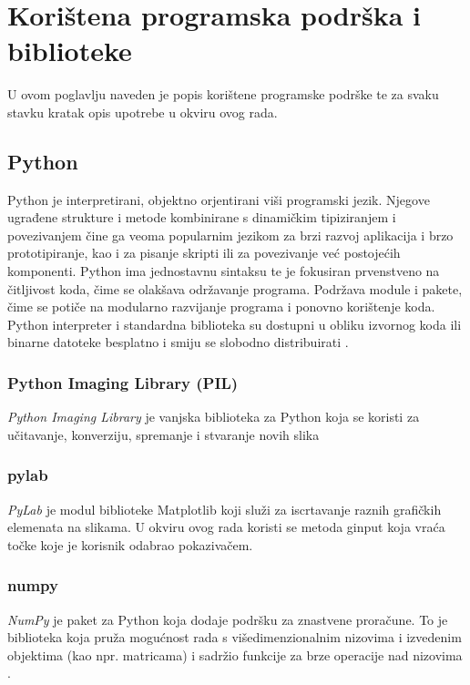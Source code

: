 \chapter{Korištena programska podrška i biblioteke}
\label{ch:podrska}

U ovom poglavlju naveden je popis korištene programske podrške te za svaku stavku kratak opis upotrebe u okviru ovog rada.

\section{Python}
\label{sec:podrskaPython}

Python je interpretirani, objektno orjentirani viši programski jezik. Njegove ugrađene strukture i metode kombinirane s dinamičkim tipiziranjem i povezivanjem čine ga veoma popularnim jezikom za brzi razvoj aplikacija  i brzo prototipiranje, kao i za pisanje skripti ili za povezivanje već postojećih komponenti. Python ima jednostavnu sintaksu te je fokusiran prvenstveno na čitljivost koda, čime se olakšava održavanje programa. Podržava module i pakete, čime se potiče na modularno razvijanje programa i ponovno korištenje koda. Python interpreter i standardna biblioteka su dostupni u obliku izvornog koda ili binarne datoteke besplatno i smiju se slobodno distribuirati \citep{Python}.

\subsection{Python Imaging Library (PIL)}
\label{subsec:pil}
\emph{Python Imaging Library} je vanjska biblioteka za Python koja se koristi za učitavanje, konverziju, spremanje i stvaranje novih slika \citep{PIL}

\subsection{pylab}
\label{subsec:pylab}

\emph{PyLab} je modul biblioteke Matplotlib koji služi za iscrtavanje raznih grafičkih elemenata na slikama. U okviru ovog rada koristi se metoda ginput koja vraća točke koje je korisnik odabrao pokazivačem.

\subsection{numpy}
\label{subsec:numpy}

\emph{NumPy} je paket za Python koja dodaje podršku za znastvene proračune. To je biblioteka koja pruža mogućnost rada s višedimenzionalnim nizovima i izvedenim objektima (kao npr. matricama) i sadržio funkcije za brze operacije nad nizovima \citep{NumPy}.

